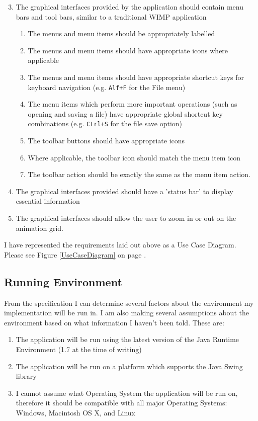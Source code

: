 \documentclass[a4paper, 11pt]{article}
\begin{document}
\begin{enumerate}
\setcounter{enumi}{2}
\item The graphical interfaces provided by the application should contain menu bars and tool bars, similar to a traditional WIMP application
\begin{enumerate}
\item The menus and menu items should be appropriately labelled
\item The menus and menu items should have appropriate icons where applicable
\item The menus and menu items should have appropriate shortcut keys for keyboard navigation (e.g. {\tt Alf+F} for the File menu)
\item The menu items which perform more important operations (such as opening and saving a file) have appropriate global shortcut key combinations (e.g. {\tt Ctrl+S} for the file save option)
\item The toolbar buttons should have appropriate icons
\item Where applicable, the toolbar icon should match the menu item icon
\item The toolbar action should be exactly the same as the menu item action.
\end{enumerate}
\item The graphical interfaces provided should have a 'status bar' to display essential information
\item The graphical interfaces should allow the user to zoom in or out on the animation grid.
\end{enumerate}

I have represented the requirements laid out above as a Use Case Diagram. Please see Figure \ref{UseCaseDiagram} on page \pageref{UseCaseDiagram}.

\subsection{Running Environment}

From the specification I can determine several factors about the environment my implementation will be run in. I am also making several assumptions about the environment based on what information I haven't been told. These are:

\begin{enumerate}
\item The application will be run using the latest version of the Java Runtime Environment (1.7 at the time of writing)
\item The application will be run on a platform which supports the Java Swing library
\item I cannot assume what Operating System the application will be run on, therefore it should be compatible with all major Operating Systems: Windows, Macintosh OS X, and Linux
\end{enumerate}
\end{document}
